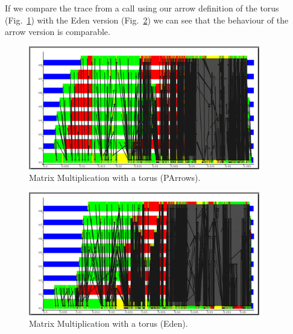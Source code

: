 If we compare the trace from a call using our arrow definition of the torus (Fig.~\ref{fig:torus_parrows_trace}) with the Eden version (Fig.~\ref{fig:torus_eden_trace}) we can see that the behaviour of the arrow version is comparable.
\begin{figure}[ht]
	\centering
	\includegraphics[width=0.9\textwidth]{images/torus_matrix_parrows_scale}
	\caption[Matrix Multiplication with a torus (Parrows)]{Matrix Multiplication with a torus (PArrows).}
	\label{fig:torus_parrows_trace}
\end{figure}

\begin{figure}[ht]
	\centering
	\includegraphics[width=0.9\textwidth]{images/torus_matrix_eden_scale}
	\caption[Matrix Multiplication with a torus (Eden)]{Matrix Multiplication with a torus (Eden).}
	\label{fig:torus_eden_trace}
\end{figure}


